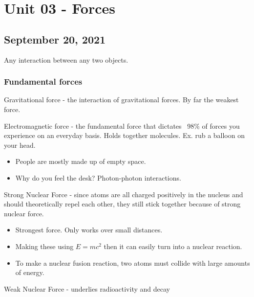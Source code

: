 \documentclass{scrreprt} %
\begin{document}
\section{Unit 03 - Forces}

\subsection{September 20, 2021}

\begin{definition}[Force]
	Any interaction between any two objects.
\end{definition}

\subsubsection{Fundamental forces}

\begin{definition}
	Gravitational force - the interaction of gravitational forces. By far the weakest force.
\end{definition}

\begin{definition}
Electromagnetic force - the fundamental force that dictates ~98\%
of forces you experience on an everyday basis. Holds together molecules.
Ex. rub a balloon on your head.
\end{definition}
\begin{itemize}
	\item People are mostly made up of empty space.
	\item Why do you feel the desk? Photon-photon interactions.
\end{itemize}

\begin{definition}
Strong Nuclear Force - since atoms are all charged positively
in the nucleus and should theoretically repel each other, they still stick
together because of strong nuclear force.
\end{definition}
\begin{itemize}
	\item Strongest force. Only works over small distances.
	\item Making these using $E=mc^2$ then it can
	easily turn into a nuclear reaction.
	\item To make a nuclear fusion reaction, two atoms must collide with large amounts
	of energy. 
\end{itemize}

\begin{definition}
	Weak Nuclear Force - underlies radioactivity and decay
\end{definition}
\end{document}
